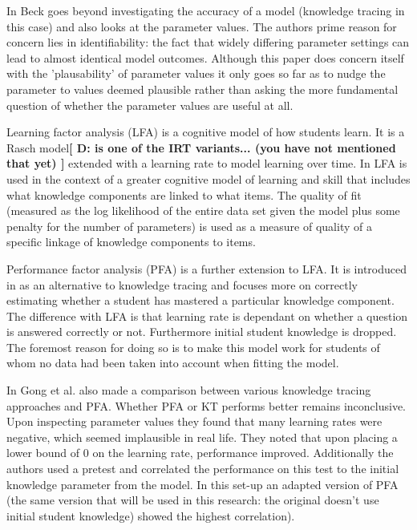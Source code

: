 \documentclass{scrartcl}
\providecommand{\comm}[1]{{\bf[ #1 ]}}
\providecommand{\commd}[1]{\comm{D: {#1}}}
\begin{document}
In \cite{knowledgeproblem} Beck goes beyond investigating the accuracy of a model (knowledge tracing in this case) and also looks at the parameter values. The authors prime reason for concern lies in identifiability: the fact that widely differing parameter settings can lead to almost identical model outcomes. Although this paper does concern itself with the 'plausability' of parameter values it only goes so far as to nudge the parameter to values deemed plausible rather than asking the more fundamental question of whether the parameter values are useful at all.

Learning factor analysis (LFA) \cite{lfa} is a cognitive model of how students learn. It is a Rasch model\commd{is one of the IRT variants... (you have not mentioned that yet)} extended with a learning rate to model learning over time. In \cite{lfa} LFA is used in the context of a greater cognitive model of learning and skill that includes what knowledge components are linked to what items. The quality of fit (measured as the log likelihood of the entire data set given the model plus some penalty for the number of parameters) is used as a measure of quality of a specific linkage of knowledge components to items.

Performance factor analysis (PFA) is a further extension to LFA. It is introduced in \cite{pfa} as an alternative to knowledge tracing and focuses more on correctly estimating whether a student has mastered a particular knowledge component. The difference with LFA is that learning rate is dependant on whether a question is answered correctly or not. Furthermore initial student knowledge is dropped. The foremost reason for doing so is to make this model work for students of whom no data had been taken into account when fitting the model.

In \cite{ktpfa} Gong et al. also made a comparison between various knowledge tracing approaches and PFA. Whether PFA or KT performs better remains inconclusive. Upon inspecting parameter values they found that many learning rates were negative, which seemed implausible in real life. They noted that upon placing a lower bound of 0 on the learning rate, performance improved.  Additionally the authors used a pretest and correlated the performance on this test to the initial knowledge parameter from the model. In this set-up an adapted version of PFA (the same version that will be used in this research: the original doesn't use initial student knowledge) showed the highest correlation).
\end{document}
